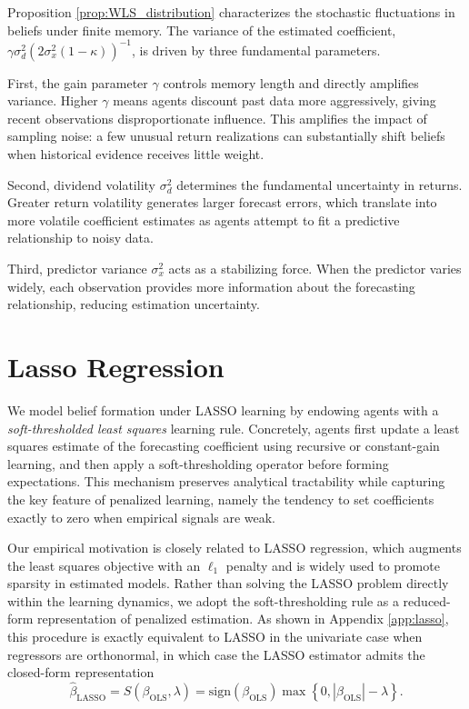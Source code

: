 \documentclass[11pt]{article}
\begin{document}
Proposition \ref{prop:WLS_distribution} characterizes the stochastic fluctuations in beliefs under finite memory. 
The variance of the estimated coefficient, $\gamma \sigma_d^2 (2\sigma^2_x(1-\kappa))^{-1}$, is driven by three fundamental parameters.

First, the gain parameter $\gamma$ controls memory length and directly amplifies variance. Higher $\gamma$ means agents discount past data more aggressively, giving recent observations disproportionate influence. This amplifies the impact of sampling noise: a few unusual return realizations can substantially shift beliefs when historical evidence receives little weight. 

Second, dividend volatility $\sigma_d^2$ determines the fundamental uncertainty in returns. Greater return volatility generates larger forecast errors, which translate into more volatile coefficient estimates as agents attempt to fit a predictive relationship to noisy data.

Third, predictor variance $\sigma^2_x$ acts as a stabilizing force. When the predictor varies widely, each observation provides more information about the forecasting relationship, reducing estimation uncertainty. 
\section{Lasso Regression}\label{sec:lasso}

We model belief formation under LASSO learning by endowing agents with a \emph{soft-thresholded least squares} learning rule. Concretely, agents first update a least squares estimate of the forecasting coefficient using recursive or constant-gain learning, and then apply a soft-thresholding operator before forming expectations. This mechanism preserves analytical tractability while capturing the key feature of penalized learning, namely the tendency to set coefficients exactly to zero when empirical signals are weak.

Our empirical motivation is closely related to LASSO regression, which augments the least squares objective with an $\ell_1$ penalty and is widely used to promote sparsity in estimated models. 
Rather than solving the LASSO problem directly within the learning dynamics, we adopt the soft-thresholding rule as a reduced-form representation of penalized estimation. 
As shown in Appendix \ref{app:lasso}, this procedure is exactly equivalent to LASSO in the univariate case when regressors are orthonormal, in which case the LASSO estimator admits the closed-form representation
\begin{equation}\label{eq:lasso_from_ols}
\hat{\beta}_{\text{LASSO}}
=
S(\beta_{\text{OLS}},\lambda)
=
\mathrm{sign}(\beta_{\text{OLS}})
\max\!\left\{0,|\beta_{\text{OLS}}|-\lambda\right\}.
\end{equation}
\end{document}
